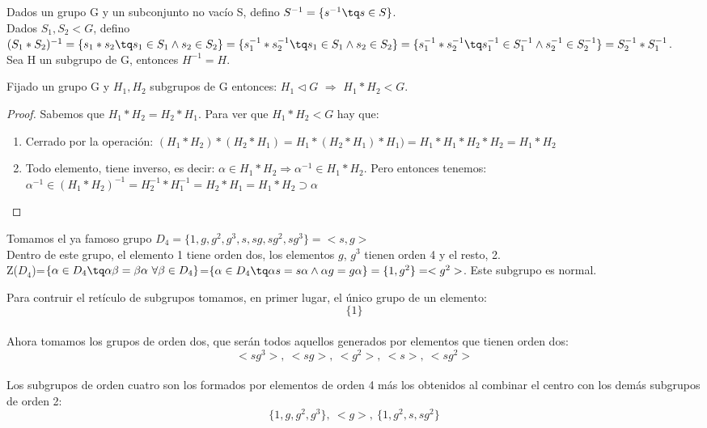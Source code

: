 \documentclass[a4paper,10pt]{apuntes}
\begin{document}
 \newpage
 
 Dados un grupo G y un subconjunto no vacío S, defino $S^{-1}=\{s^{-1}\tq s\in S\}$.\\
 Dados $S_{1},S_{2}<G$, defino $(S_{1}\ast S_{2})^{-1}=\{s_{1}\ast s_{2}\tq s_{1}\in S_{1} \wedge s_{2}\in S_{2}\}=\{s_{1}^{-1}\ast s_{2}^{-1}\tq s_{1}\in S_{1} \wedge s_{2}\in S_{2}\}=
 \{s_{1}^{-1}\ast s_{2}^{-1}\tq s_{1}^{-1}\in S_{1}^{-1} \wedge s_{2}^{-1}\in S_{2}^{-1}\}=S_{2}^{-1}\ast S_{1}^{-1}$.\\
 Sea H un subgrupo de G, entonces $H^{-1}=H$.
 
 \begin{theorem}
  Fijado un grupo G y $H_{1}, H_{2}$  subgrupos de G entonces: $H_{1} \vartriangleleft G$ $\Rightarrow$ $H_{1}\ast H_{2}<G$. 
 \end{theorem}
 \begin{proof}
  Sabemos que $H_{1}\ast H_{2}=H_{2}\ast H_{1}$. Para ver que $H_{1}\ast H_{2}<G$  hay que:
  \begin{enumerate}
   \item Cerrado por la operación: $(H_{1}\ast H_{2})\ast (H_{2}\ast H_{1})=H_{1}\ast (H_{2}\ast H_{1})\ast H_{1})=H_{1}\ast H_{1}\ast H_{2}\ast H_{2}=H_{1}\ast H_{2}$
   \item Todo elemento, tiene inverso, es decir: $\alpha\in H_{1}\ast H_{2}\Rightarrow \alpha^{-1}\in H_{1}\ast H_{2}$. Pero entonces tenemos:
   $\alpha^{-1}\in (H_{1}\ast H_{2})^{-1} = H_{2}^{-1}\ast H_{1}^{-1}=H_{2}\ast H_{1}=H_{1}\ast H_{2}\supset\alpha$
  \end{enumerate}

 \end{proof}

 \begin{example}
  Tomamos el ya famoso grupo $D_{4}=\{1,g,g^{2},g^{3}, s, sg, sg^{2}, sg^{3}\}=<s,g>$\\
  Dentro de este grupo, el elemento 1 tiene orden dos, los elementos $g$, $g^{3}$  tienen orden 4 y el resto, 2.\\
  Z($D_{4}$)=$\{\alpha\in D_{4} \tq \alpha\beta=\beta\alpha \ \forall \beta \in D_{4}\}$=$\{\alpha\in D_{4}\tq \alpha s = s\alpha \wedge \alpha g = g\alpha\}=\{1, g^{2}\}=<g^{2}>$. Este subgrupo es normal.
  
  Para contruir el retículo de subgrupos tomamos, en primer lugar, el único grupo de un elemento: \\
  $$\{1\}$$\\
  Ahora tomamos los grupos de orden dos, que serán todos aquellos generados por elementos que tienen orden dos:\\
  $$<sg^{3}>, \ <sg>, \ <g^{2}>, \ <s>, \ <sg^{2}>$$\\
  Los subgrupos de orden cuatro son los formados por elementos de orden 4 más los obtenidos al combinar el centro con los demás subgrupos de orden 2:\\
  $$\{1,g,g^{2},g^{3}\}, \ <g>, \ \{1, g^{2}, s, sg^{2}\}$$
 \end{example}
 
\end{document}

